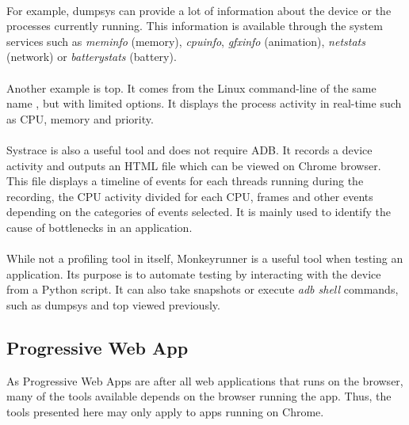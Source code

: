 \documentclass{kththesis}
\begin{document}
\paragraph{}
For example, dumpsys \cite{dumpsys} can provide a lot of information about the device or the processes currently running. This information is available through the system services such as \textit{meminfo} (memory), \textit{cpuinfo}, \textit{gfxinfo} (animation), \textit{netstats} (network) or \textit{batterystats} (battery).

\paragraph{}
Another example is top. It comes from the Linux command-line of the same name \cite{top}, but with limited options. It displays the process activity in real-time such as CPU, memory and priority.

\paragraph{}
Systrace \cite{systrace} is also a useful tool and does not require ADB. It records a device activity and outputs an HTML file which can be viewed on Chrome browser. This file displays a timeline of events for each threads running during the recording, the CPU activity divided for each CPU, frames and other events depending on the categories of events selected. It is mainly used to identify the cause of bottlenecks in an application.

\paragraph{}
While not a profiling tool in itself, Monkeyrunner \cite{monkeyrunner} is a useful tool when testing an application. Its purpose is to automate testing by interacting with the device from a Python script. It can also take snapshots or execute \textit{adb shell} commands, such as dumpsys and top viewed previously. 

\subsection{Progressive Web App}

As Progressive Web Apps are after all web applications that runs on the browser, many of the tools available depends on the browser running the app. Thus, the tools presented here may only apply to apps running on Chrome.
\end{document}
